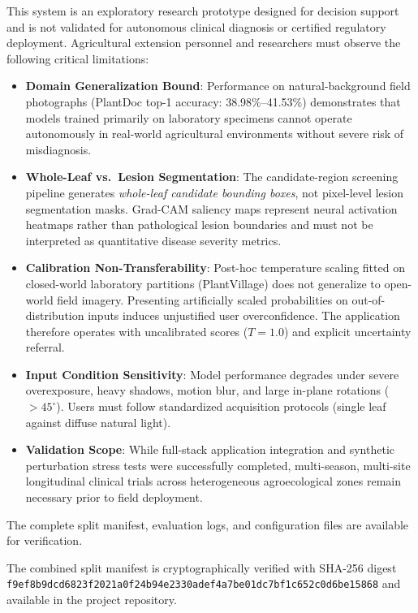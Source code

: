 \documentclass[pdflatex,sn-mathphys-num]{sn-jnl}
\theoremstyle{thmstyleone}%
\theoremstyle{thmstyletwo}%
\theoremstyle{thmstylethree}%
\begin{document}
This system is an exploratory research prototype designed for decision support and is not validated for autonomous clinical diagnosis or certified regulatory deployment. Agricultural extension personnel and researchers must observe the following critical limitations:
\begin{itemize}
  \item \textbf{Domain Generalization Bound}: Performance on natural-background field photographs (PlantDoc top-1 accuracy: 38.98\%--41.53\%) demonstrates that models trained primarily on laboratory specimens cannot operate autonomously in real-world agricultural environments without severe risk of misdiagnosis.
  \item \textbf{Whole-Leaf vs.\ Lesion Segmentation}: The candidate-region screening pipeline generates \textit{whole-leaf candidate bounding boxes}, not pixel-level lesion segmentation masks. Grad-CAM saliency maps represent neural activation heatmaps rather than pathological lesion boundaries and must not be interpreted as quantitative disease severity metrics.
  \item \textbf{Calibration Non-Transferability}: Post-hoc temperature scaling fitted on closed-world laboratory partitions (PlantVillage) does not generalize to open-world field imagery. Presenting artificially scaled probabilities on out-of-distribution inputs induces unjustified user overconfidence. The application therefore operates with uncalibrated scores ($T=1.0$) and explicit uncertainty referral.
  \item \textbf{Input Condition Sensitivity}: Model performance degrades under severe overexposure, heavy shadows, motion blur, and large in-plane rotations ($>45^\circ$). Users must follow standardized acquisition protocols (single leaf against diffuse natural light).
  \item \textbf{Validation Scope}: While full-stack application integration and synthetic perturbation stress tests were successfully completed, multi-season, multi-site longitudinal clinical trials across heterogeneous agroecological zones remain necessary prior to field deployment.
\end{itemize}


\backmatter

The complete split manifest, evaluation logs, and configuration files are available for verification.

The combined split manifest is cryptographically verified with SHA-256 digest \texttt{f9ef8b9dcd6823f2021a0f24b94e2330adef4a7be01dc7bf1c652c0d6be15868} and available in the project repository.
\end{document}
